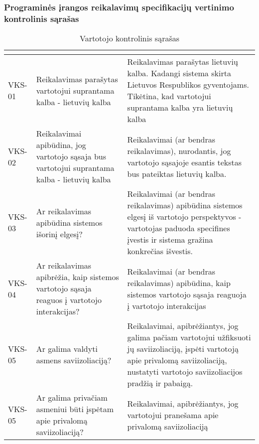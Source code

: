\documentclass{VUMIFPSkursinis}
\begin{document}
			\subsubsection{Programinės įrangos reikalavimų specifikacijų vertinimo kontrolinis sąrašas}
			\begin{center}

				\begin{longtable}{|C{2cm}|L{5cm}|L{8cm}|}

					\caption{Vartotojo kontrolinis sąrašas}
					\label{table:VKS}

 					\\ \hline
 					 &
  					 & 
 					\\ \hline
 					VKS-01 &
 					Reikalavimas parašytas vartotojui suprantama kalba - lietuvių kalba& 
 					Reikalavimas parašytas lietuvių kalba. Kadangi sistema skirta Lietuvos Respublikos gyventojams. Tikėtina, kad vartotojui suprantama kalba yra lietuvių kalba\\ \hline
 					VKS-02 &
 					Reikalavimai apibūdina, jog vartotojo sąsaja bus vartotojui suprantama kalba - lietuvių kalba&
 					Reikalavimai (ar bendras reikalavimas), nurodantis, jog vartotojo sąsajoje esantis tekstas bus pateiktas lietuvių kalba.\\ \hline
 					VKS-03 &
 					Ar reikalavimas apibūdina sistemos išorinį elgesį? & 
					Reikalavimai (ar bendras reikalavimas) apibūdina sistemos elgesį iš vartotojo perspektyvos - vartotojas paduoda specifines įvestis ir sistema gražina konkrečias išvestis.\\ \hline  
 					VKS-04 &
 					Ar reikalavimas apibrėžia, kaip sistemos vartotojo sąsaja reaguos į vartotojo interakcijas?& 
 					Reikalavimai (ar bendras reikalavimas) apibūdina, kaip sistemos vartotojo sąsaja reaguoja į vartotojo interakcijas\\ \hline    
 					VKS-05 &
 					Ar galima valdyti asmens saviizoliaciją?& 
 					Reikalavimai, apibrėžiantys, jog galima pačiam vartotojui užfiksuoti jų saviizoliaciją, įspėti vartotoją apie privalomą saviizoliaciją, nustatyti vartotojo saviizoliacijos pradžią ir pabaigą.\\ \hline  
 					VKS-05 &
 					Ar galima privačiam asmeniui būti įspėtam apie privalomą saviizoliaciją?& 
 					Reikalavimai, apibrėžiantys, jog vartotojui pranešama apie privalomą saviizoliaciją\\ \hline   					

\end{longtable}
\end{center}
\end{document}
